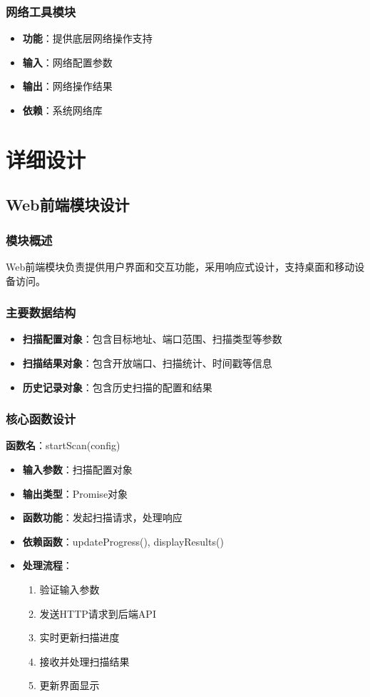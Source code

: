 \documentclass[12pt,hyperref,a4paper,UTF8]{ctexart}
\begin{document}
\subsubsection{网络工具模块}
\begin{itemize}
    \item \textbf{功能}：提供底层网络操作支持
    \item \textbf{输入}：网络配置参数
    \item \textbf{输出}：网络操作结果
    \item \textbf{依赖}：系统网络库
\end{itemize}

\section{详细设计}

\subsection{Web前端模块设计}

\subsubsection{模块概述}
Web前端模块负责提供用户界面和交互功能，采用响应式设计，支持桌面和移动设备访问。

\subsubsection{主要数据结构}
\begin{itemize}
    \item \textbf{扫描配置对象}：包含目标地址、端口范围、扫描类型等参数
    \item \textbf{扫描结果对象}：包含开放端口、扫描统计、时间戳等信息
    \item \textbf{历史记录对象}：包含历史扫描的配置和结果
\end{itemize}

\subsubsection{核心函数设计}

\textbf{函数名}：startScan(config)
\begin{itemize}
    \item \textbf{输入参数}：扫描配置对象
    \item \textbf{输出类型}：Promise对象
    \item \textbf{函数功能}：发起扫描请求，处理响应
    \item \textbf{依赖函数}：updateProgress(), displayResults()
    \item \textbf{处理流程}：
    \begin{enumerate}
        \item 验证输入参数
        \item 发送HTTP请求到后端API
        \item 实时更新扫描进度
        \item 接收并处理扫描结果
        \item 更新界面显示
    \end{enumerate}
\end{itemize}
\end{document}

